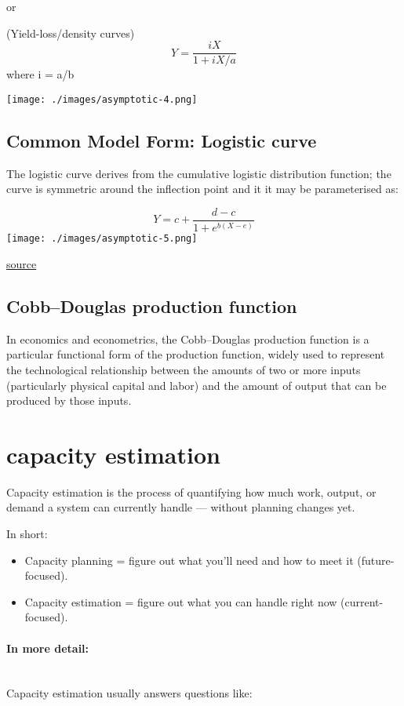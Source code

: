 \documentclass{article}
\begin{document}
or

(Yield-loss/density curves)
$$
Y = \frac{i X}{1 + iX / a}
$$
where i = a/b

\texttt{[image: ./images/asymptotic-4.png]}


\subsection{Common Model Form: Logistic curve}
The logistic curve derives from the cumulative logistic distribution function; the curve is symmetric around the inflection point and it it may be parameterised as:

$$
Y = c + \frac{d - c }{1 + e^{b(X-e)}}
$$
\texttt{[image: ./images/asymptotic-5.png]}

\href{https://www.statforbiology.com/nonlinearregression/usefulequations}{source}

\subsection{Cobb–Douglas production function}
In economics and econometrics, the Cobb–Douglas production function is a particular functional form of the production function, widely used to represent the technological relationship between the amounts of two or more inputs (particularly physical capital and labor) and the amount of output that can be produced by those inputs.


\section{capacity estimation}
Capacity estimation is the process of quantifying how much work, output, or demand a system can currently handle — without planning changes yet.

In short:

\begin{itemize}
\item Capacity planning = figure out what you’ll need and how to meet it (future-focused).
\item Capacity estimation = figure out what you can handle right now (current-focused).
\end{itemize}

\paragraph{In more detail:}~\\
Capacity estimation usually answers questions like:
\end{document}
